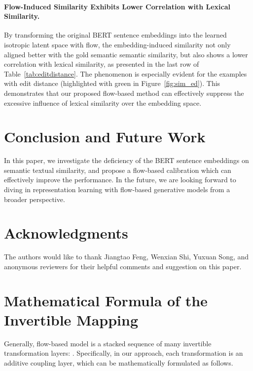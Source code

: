 \documentclass[11pt,a4paper]{article}
\begin{document}
\paragraph{Flow-Induced Similarity Exhibits Lower Correlation with Lexical Similarity.}
By transforming the original BERT sentence embeddings into the learned isotropic latent space with flow, the embedding-induced similarity not only aligned better with the gold semantic semantic similarity, but also shows a lower correlation with lexical similarity, as presented in the last row of Table~\ref{tab:editdistance}. The phenomenon is especially evident for the examples with edit distance  (highlighted with {\color{green} green} in Figure~\ref{fig:sim_ed}).
This demonstrates that our proposed flow-based method can effectively suppress the excessive influence of lexical similarity over the embedding space.











 \section{Conclusion and Future Work}
In this paper, we investigate the deficiency of the BERT sentence embeddings on semantic textual similarity, and propose a flow-based calibration which can effectively improve the performance. In the future, we are looking forward to diving in representation learning with flow-based generative models from a broader perspective.
 
\section*{Acknowledgments}
The authors would like to thank Jiangtao Feng, Wenxian Shi, Yuxuan Song, and anonymous reviewers for their helpful comments and suggestion on this paper.

\newpage



\newpage
\appendix
\onecolumn
\section{Mathematical Formula of the Invertible Mapping}
\label{sec:appendix:additive:coupling}
Generally, flow-based model is a stacked sequence of many invertible transformation layers: . Specifically, in our approach, each transformation  is an additive coupling layer, which can be mathematically formulated as follows.
\end{document}
